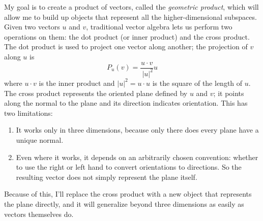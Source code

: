 \documentclass{utarticle}
\DeclareMathOperator{\inp}{\cdot}
\begin{document}
My goal is to create a product of vectors, called the \emph{geometric product}, which 
will allow me to build up objects that represent all the higher-dimensional subspaces.
Given two vectors $u$ and $v$, traditional vector algebra lets us perform two operations 
on them: the dot product (or inner product) and the cross product.  The dot 
product is used to project one vector along another; the projection of $v$ along $u$ is
\begin{equation} 
P_u(v) = \frac{u \inp v}{\ |u|^2}u
\label{vecproj}
\end{equation}
where $u \inp v$ is the inner product and $|u|^2 = u \inp u$ is the
square of the length of $u$. The cross product represents the oriented plane defined by $u$
and $v$; it points along the normal to the plane and its direction indicates orientation.  This
has two limitations:
\begin{enumerate}
\item It works only in three dimensions, because only there does every plane have a unique 
          normal.  
\item Even where it works, it depends on an arbitrarily chosen convention: whether to use
          the right or left hand to convert orientations to directions.  So the resulting vector does
          not simply represent the plane itself.
\end{enumerate}
Because of this, I'll replace the cross product with a new object that 
represents the plane directly, and it will generalize beyond three dimensions as
easily as vectors themselves do.
\end{document}
